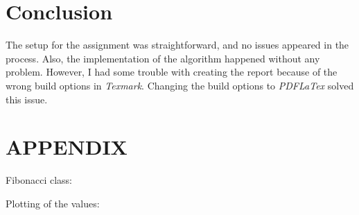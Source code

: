 \documentclass[10pt, a4paper, twocolumn]{article} %
\begin{document}
\section{Conclusion}
The setup for the assignment was straightforward, and no issues appeared in the process. Also, the implementation of the algorithm happened without any problem. However, I had some trouble with creating the report because of the wrong build options in \textit{Texmark}. Changing the build options to \textit{PDFLaTex} solved this issue. 

\newpage

\section*{APPENDIX}

Fibonacci class: 

\newpage

Plotting of the values:






\printbibliography[title={Bibliography}] %

\end{document}
